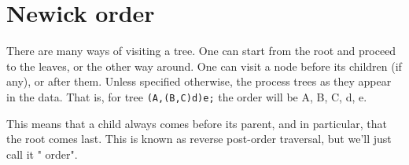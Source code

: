 \chapter{Newick order}
\label{newick_order}

There are many ways of visiting a tree. One can start from the root and
proceed to the leaves, or the other way around. One can visit a node before
its children (if any), or after them. Unless specified otherwise, the
\nutils{} process trees as they appear in the \nw{} data. That is, for
tree \texttt{(A,(B,C)d)e;} the order will be A, B, C, d, e.

This means that a child always comes before its parent, and in particular,
that the root comes last. This is known as reverse post-order traversal, but
we'll just call it "\nw{} order".
